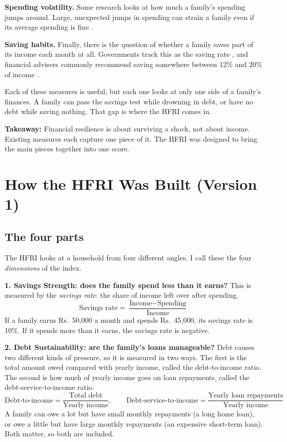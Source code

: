 \documentclass[11pt,a4paper]{article}
\newcommand{\takeaway}[1]{\par\smallskip\noindent\textbf{Takeaway:} #1\par\smallskip}
\newcommand{\pct}{\%}
\begin{document}
\textbf{Spending volatility.} Some research looks at how much a family's spending jumps around. Large, unexpected jumps
in spending can strain a family even if its average spending is fine \cite{jpmc2017,greig,fisher,chakrabarty}.

\textbf{Saving habits.} Finally, there is the question of whether a family saves part of its income each month at
all. Governments track this as the saving rate \cite{oecd_sav,bea1,bea2,nyfed}, and financial advisers commonly
recommend saving somewhere between 12\pct{} and 20\pct{} of income \cite{vanguard,fidelity1,fidelity2,sc,bcg}.

Each of these measures is useful, but each one looks at only one side of a family's finances. A family can pass the
savings test while drowning in debt, or have no debt while saving nothing. That gap is where the HFRI comes in.

\takeaway{Financial resilience is about surviving a shock, not about income. Existing measures each capture one piece
of it. The HFRI was designed to bring the main pieces together into one score.}

\section{How the HFRI Was Built (Version 1)}
\subsection{The four parts}
The HFRI looks at a household from four different angles. I call these the four \emph{dimensions} of the index.

\textbf{1. Savings Strength: does the family spend less than it earns?} This is measured by the \emph{savings rate}:
the share of income left over after spending.
\[
\text{Savings rate} = \frac{\text{Income} - \text{Spending}}{\text{Income}}
\]
If a family earns Rs.\ 50,000 a month and spends Rs.\ 45,000, its savings rate is 10\pct. If it spends more than it
earns, the savings rate is negative.

\textbf{2. Debt Sustainability: are the family's loans manageable?} Debt causes two different kinds of pressure, so it
is measured in two ways. The first is the total amount owed compared with yearly income, called the debt-to-income
ratio. The second is how much of yearly income goes on loan repayments, called the debt-service-to-income ratio.
\[
\text{Debt-to-income} = \frac{\text{Total debt}}{\text{Yearly income}}, \qquad
\text{Debt-service-to-income} = \frac{\text{Yearly loan repayments}}{\text{Yearly income}}
\]
A family can owe a lot but have small monthly repayments (a long home loan), or owe a little but have large monthly
repayments (an expensive short-term loan). Both matter, so both are included.
\end{document}
